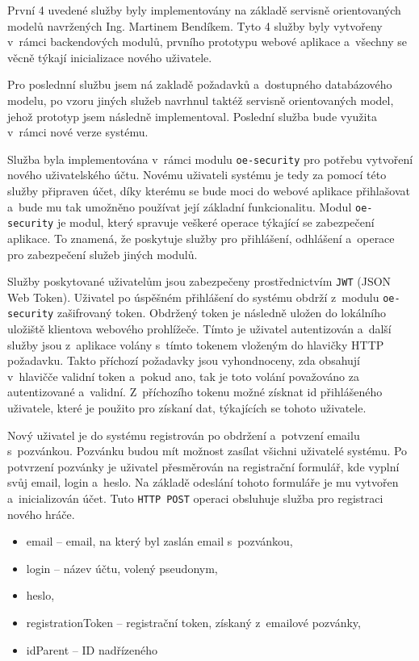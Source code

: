 \documentclass[twoside, 12pt]{article}
\begin{document}
{První 4 uvedené služby byly implementovány na základě servisně orientovaných modelů navržených Ing. Martinem Bendíkem.
Tyto 4 služby byly vytvořeny v~rámci backendových modulů, prvního prototypu webové aplikace
a~všechny se věcně týkají inicializace nového uživatele.

Pro poslednní službu jsem ná zakladě požadavků a~dostupného databázového modelu,
po vzoru jiných služeb  navrhnul taktéž servisně orientovaných model,
jehož prototyp jsem následně implementoval.
Poslední služba bude využita v~rámci nové verze systému.

\clearpage


Služba byla implementována v~rámci modulu \texttt{oe-security} pro potřebu vytvoření nového uživatelského účtu.
Novému uživateli systému je tedy za pomocí této služby připraven účet,
díky kterému se bude moci do webové aplikace přihlašovat a~bude mu tak umožněno používat její základní funkcionalitu.
Modul \texttt{oe-security} je modul, který spravuje veškeré operace týkající se zabezpečení aplikace.
To znamená, že poskytuje služby pro přihlášení, odhlášení a~operace pro zabezpečení služeb jiných modulů.

Služby poskytované uživatelům jsou zabezpečeny prostřednictvím \texttt{JWT} (JSON Web Token).
Uživatel po úspěšném přihlášení do systému obdrží z~modulu \texttt{oe-security} zašifrovaný token.
Obdržený token je následně uložen do lokálního uložiště klientova webového prohlížeče.
Tímto je uživatel autentizován a~další služby jsou z~aplikace volány s~tímto tokenem vloženým do hlavičky HTTP požadavku.
Takto příchozí požadavky jsou vyhondnoceny, zda obsahují v~hlavičče validní token a~pokud ano,
tak je toto volání považováno za autentizované a~validní.
Z~příchozího tokenu možné získnat id přihlášeného uživatele,
které je použito pro získaní dat, týkajících se tohoto uživatele.

Nový uživatel je do systému registrován po obdržení a~potvzení emailu s~pozvánkou.
Pozvánku budou mít možnost zasílat všichni uživatelé systému.
Po potvrzení pozvánky je uživatel přesměrován na registrační
formulář, kde vyplní svůj email, login a~heslo.
Na základě odeslání tohoto formuláře je mu vytvořen a~inicializován účet.
Tuto \texttt{HTTP POST} operaci obsluhuje služba pro registraci nového hráče.

\vspace{10}

\begin{itemize}
\item email -- email, na který byl zaslán email s~pozvánkou,
\item login -- název účtu, volený pseudonym,
\item heslo,
\item registrationToken -- registrační token, získaný z~emailové pozvánky,
\item idParent -- ID nadřízeného
\end{itemize}

}
\end{document}
